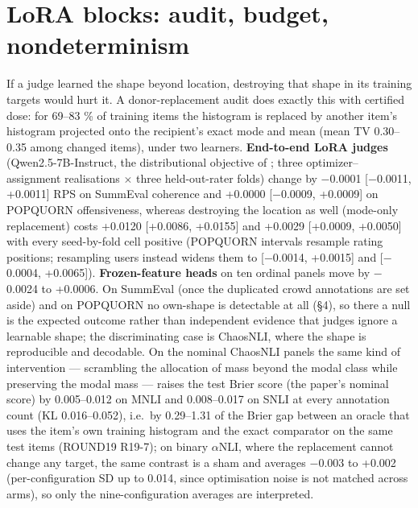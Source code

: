 \documentclass{article}
\begin{document}
\section{LoRA blocks: audit, budget, nondeterminism}


If a judge learned the shape beyond location, destroying that shape in its training targets would hurt it. A donor-replacement audit does exactly this with certified dose: for 69--83 \% of training items the histogram is replaced by another item's histogram projected onto the recipient's exact mode and mean (mean TV 0.30--0.35 among changed items), under two learners. \textbf{End-to-end LoRA judges} (Qwen2.5-7B-Instruct, the distributional objective of \citealp{chen2025beyond}; three optimizer--assignment realisations $\times$ three held-out-rater folds) change by $-$0.0001 {[}$-$0.0011, +0.0011{]} RPS on SummEval coherence and +0.0000 {[}$-$0.0009, +0.0009{]} on POPQUORN offensiveness, whereas destroying the location as well (mode-only replacement) costs +0.0120 {[}+0.0086, +0.0155{]} and +0.0029 {[}+0.0009, +0.0050{]} with every seed-by-fold cell positive (POPQUORN intervals resample rating positions; resampling users instead widens them to {[}$-$0.0014, +0.0015{]} and {[}$-$0.0004, +0.0065{]}). \textbf{Frozen-feature heads} on ten ordinal panels move by $-$0.0024 to +0.0006. On SummEval (once the duplicated crowd annotations are set aside) and on POPQUORN no own-shape is detectable at all (\S{}4), so there a null is the expected outcome rather than independent evidence that judges ignore a learnable shape; the discriminating case is ChaosNLI, where the shape is reproducible and decodable. On the nominal ChaosNLI panels the same kind of intervention --- scrambling the allocation of mass beyond the modal class while preserving the modal mass --- raises the test Brier score (the paper's nominal score) by 0.005--0.012 on MNLI and 0.008--0.017 on SNLI at every annotation count (KL 0.016--0.052), i.e.~by 0.29--1.31 of the Brier gap between an oracle that uses the item's own training histogram and the exact comparator on the same test items (ROUND19 R19-7); on binary $\alpha$NLI, where the replacement cannot change any target, the same contrast is a sham and averages $-$0.003 to +0.002 (per-configuration SD up to 0.014, since optimisation noise is not matched across arms), so only the nine-configuration averages are interpreted.
\end{document}
